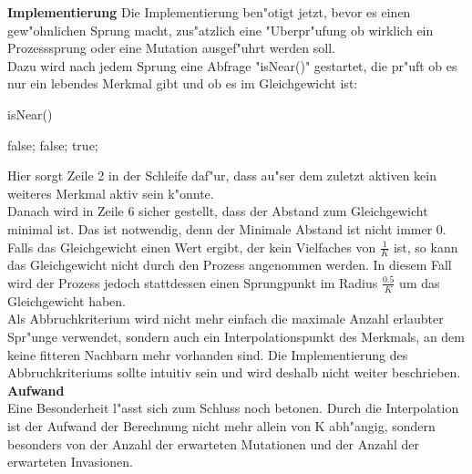 \documentclass[11pt, a4paper, german]{article}
\theoremstyle{plain}
\begin{document}
	\textbf{Implementierung}
	Die Implementierung ben"otigt jetzt, bevor es einen gew"ohnlichen Sprung macht, zus"atzlich eine "Uberpr"ufung ob wirklich ein Prozesssprung oder eine Mutation ausgef"uhrt werden soll.\\
	Dazu wird nach jedem Sprung eine Abfrage "isNear()" gestartet, die pr"uft ob es nur ein lebendes Merkmal gibt und ob es im Gleichgewicht ist:
	\begin{algorithm}[H]
		\caption{isNear()}
		\begin{algorithmic}[1]
					\Return false;
				\EndIf
			\EndFor
				\Return false;
			\EndIf
			\Return true;
		\end{algorithmic}
	\end{algorithm}
	Hier sorgt Zeile 2 in der Schleife daf"ur, dass au"ser dem zuletzt aktiven kein weiteres Merkmal aktiv sein k"onnte.\\
	Danach wird in Zeile 6 sicher gestellt, dass der Abstand zum Gleichgewicht minimal ist. Das ist notwendig, denn der Minimale Abstand ist nicht immer $ 0 $. Falls das Gleichgewicht einen Wert ergibt, der kein Vielfaches von $ \frac{1}{K} $ ist, so kann das Gleichgewicht nicht durch den Prozess angenommen werden. In diesem Fall wird der Prozess jedoch stattdessen einen Sprungpunkt im Radius $ \frac{0.5}{K} $ um das Gleichgewicht haben.\\
	Als Abbruchkriterium wird nicht mehr einfach die maximale Anzahl erlaubter Spr"unge verwendet, sondern auch ein Interpolationspunkt des Merkmals, an dem keine fitteren Nachbarn mehr vorhanden sind. Die Implementierung des Abbruchkriteriums sollte intuitiv sein und wird deshalb nicht weiter beschrieben.\\
	
	\textbf{Aufwand}\\
	Eine Besonderheit l"asst sich zum Schluss noch betonen. Durch die Interpolation ist der Aufwand der Berechnung nicht mehr allein von K abh"angig, sondern besonders von der Anzahl der erwarteten Mutationen und der Anzahl der erwarteten Invasionen.
	

\clearpage
\end{document}

